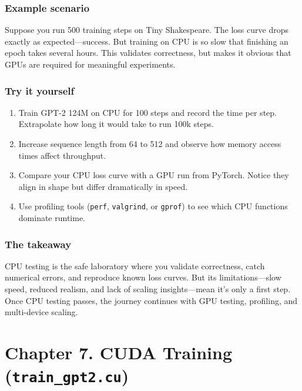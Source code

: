 \documentclass[
  letterpaper,
  DIV=11,
  numbers=noendperiod]{scrreprt}
\providecommand{\tightlist}{%
  \setlength{\itemsep}{0pt}\setlength{\parskip}{0pt}}
\begin{document}
\subsubsection{Example scenario}\label{example-scenario-4}

Suppose you run 500 training steps on Tiny Shakespeare. The loss curve
drops exactly as expected---success. But training on CPU is so slow that
finishing an epoch takes several hours. This validates correctness, but
makes it obvious that GPUs are required for meaningful experiments.

\subsubsection{Try it yourself}\label{try-it-yourself-48}

\begin{enumerate}
\def\labelenumi{\arabic{enumi}.}
\tightlist
\item
  Train GPT-2 124M on CPU for 100 steps and record the time per step.
  Extrapolate how long it would take to run 100k steps.
\item
  Increase sequence length from 64 to 512 and observe how memory access
  times affect throughput.
\item
  Compare your CPU loss curve with a GPU run from PyTorch. Notice they
  align in shape but differ dramatically in speed.
\item
  Use profiling tools (\texttt{perf}, \texttt{valgrind}, or
  \texttt{gprof}) to see which CPU functions dominate runtime.
\end{enumerate}

\subsubsection{The takeaway}\label{the-takeaway-49}

CPU testing is the safe laboratory where you validate correctness, catch
numerical errors, and reproduce known loss curves. But its
limitations---slow speed, reduced realism, and lack of scaling
insights---mean it's only a first step. Once CPU testing passes, the
journey continues with GPU testing, profiling, and multi-device scaling.

\section{\texorpdfstring{Chapter 7. CUDA Training
(\texttt{train\_gpt2.cu})}{Chapter 7. CUDA Training (train\_gpt2.cu)}}\label{chapter-7.-cuda-training-train_gpt2.cu}
\end{document}
